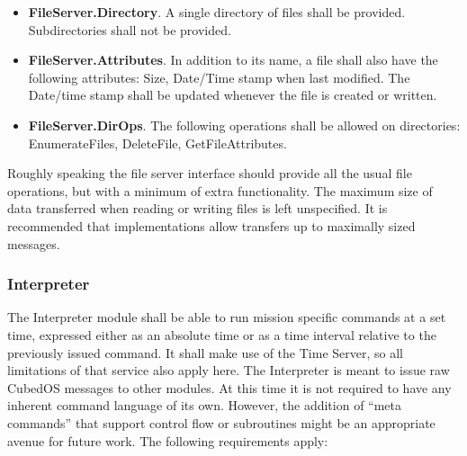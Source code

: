 \begin{itemize}
  files. All data transfers shall be explicit (if a carriage return or line feed character is
  desired, it shall be written explicitly and processed explicitly on reads).
\item \textbf{FileServer.Directory}. A single directory of files shall be provided.
  Subdirectories shall not be provided.
\item \textbf{FileServer.Attributes}. In addition to its name, a file shall also have the
  following attributes: Size, Date/Time stamp when last modified. The Date/time stamp shall be
  updated whenever the file is created or written.
\item \textbf{FileServer.DirOps}. The following operations shall be allowed on directories:
  EnumerateFiles, DeleteFile, GetFileAttributes.
\end{itemize}

Roughly speaking the file server interface should provide all the usual file operations, but
with a minimum of extra functionality. The maximum size of data transferred when reading or
writing files is left unspecified. It is recommended that implementations allow transfers up to
maximally sized messages.


\subsubsection{Interpreter}
\label{sec:requirements-interpreter}

The Interpreter module shall be able to run mission specific commands at a set time, expressed
either as an absolute time or as a time interval relative to the previously issued command. It
shall make use of the Time Server, so all limitations of that service also apply here. The
Interpreter is meant to issue raw CubedOS messages to other modules. At this time it is not
required to have any inherent command language of its own. However, the addition of ``meta
commands'' that support control flow or subroutines might be an appropriate avenue for future
work. The following requirements apply:

